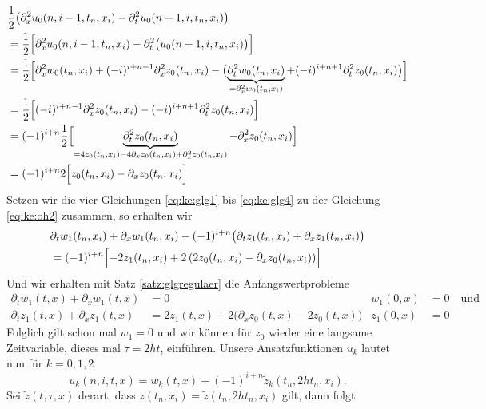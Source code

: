 \begin{align}\label{eq:ke:glg4}
\begin{split}
&\frac{1}{2} \bigl( \partial^2_x u_0(n, i-1, t_n, x_i) - \partial^2_t u_0(n+1,i, t_n, x_i)\bigr)\\
&= \frac{1}{2} \Bigl[ \partial^2_x u_0(n, i-1, t_n, x_i) - \partial^2_t \bigl( u_0(n+1,i, t_n, x_i)\bigr) \Bigr]\\
&= \frac{1}{2} \Bigl[ \partial^2_x w_0(t_n, x_i) + (-i)^{i+n-1} \partial^2_x z_0(t_n, x_i) - \bigl( \underbrace{\partial^2_t w_0(t_n, x_i)}_{= \partial^2_x w_0(t_n, x_i)} + (-i)^{i+n+1} \partial^2_t z_0(t_n, x_i) \bigr) \Bigr]\\
&= \frac{1}{2} \Bigl[ (-i)^{i+n-1} \partial^2_x z_0(t_n, x_i) - (-i)^{i+n+1} \partial^2_t z_0(t_n, x_i) \Bigr]\\
&= (-1)^{i+n} \frac{1}{2} \Bigl[ \underbrace{\partial^2_t z_0(t_n, x_i)}_{= 4 z_0(t_n,x_i) - 4 \partial_x z_0(t_n,x_i) + \partial^2_x z_0(t_n,x_i)} - \partial^2_x z_0(t_n, x_i) \Bigr]\\
&= (-1)^{i+n} 2 \Bigl[ z_0(t_n,x_i) - \partial_x z_0(t_n,x_i) \Bigr]\\
\end{split}
\end{align}
Setzen wir die vier Gleichungen \eqref{eq:ke:glg1} bis \eqref{eq:ke:glg4} zu der Gleichung \eqref{eq:ke:oh2} zusammen, so erhalten wir
\begin{align*}
&\partial_t w_1(t_n,x_i) + \partial_x w_1(t_n,x_i) - (-1)^{i+n} \bigl( \partial_t z_1(t_n,x_i) + \partial_x z_1(t_n,x_i) \bigr)\\
&= (-1)^{i+n} \Bigl[ - 2 z_1(t_n,x_i) + 2 \left( 2 z_0(t_n,x_i) - \partial_x z_0(t_n,x_i) \right) \Bigr] 
\end{align*}
Und wir erhalten mit Satz \ref{satz:glgregulaer} die Anfangswertprobleme 
\begin{align}\label{eq:appendix:kleineta:oh2}
\partial_t w_1(t,x) + \partial_x w_1(t,x) &= 0 &w_1(0,x) &= 0 \quad \text{und}\\
\partial_t z_1(t,x) + \partial_x z_1(t,x) &= 2 z_1(t,x) + 2 \bigl( \partial_x z_0(t,x) - 2z_0(t,x) \bigr)  &z_1(0,x) &= 0
\end{align}
Folglich gilt schon mal $w_1 = 0$ und wir können für $z_0$ wieder eine langsame Zeitvariable, dieses mal $\tau = 2ht$, einführen.
Unsere Ansatzfunktionen $u_k$ lautet nun für $k = 0, 1, 2$
\[ u_k(n, i, t, x) = w_k(t, x) + (-1)^{i+n} \tilde z_k(t_n, 2 h t_n, x_i). \]
Sei $\tilde z(t, \tau, x)$ derart, dass $z(t_n, x_i) = \tilde z(t_n, 2 h t_n, x_i)$ gilt, dann folgt
